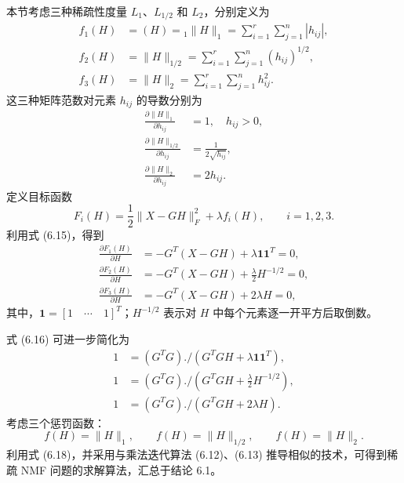 本节考虑三种稀疏性度量 $L_1$、$L_{1/2}$ 和 $L_2$，分别定义为
\[
\begin{aligned}
f_1(H)&=(H)={}_1\lVert H\rVert_1=\sum_{i=1}^r\sum_{j=1}^n|h_{ij}|,\\
f_2(H)&=\lVert H\rVert_{1/2}=\sum_{i=1}^r\sum_{j=1}^n(h_{ij})^{1/2},\\
f_3(H)&=\lVert H\rVert_2=\sum_{i=1}^r\sum_{j=1}^nh_{ij}^2.
\end{aligned}
\]
这三种矩阵范数对元素 $h_{ij}$ 的导数分别为
\begin{equation}
\begin{aligned}
\frac{\partial\lVert H\rVert_1}{\partial h_{ij}}&=1,\quad h_{ij}>0,\\
\frac{\partial\lVert H\rVert_{1/2}}{\partial h_{ij}}&=\frac1{2\sqrt{h_{ij}}},\\
\frac{\partial\lVert H\rVert_2}{\partial h_{ij}}&=2h_{ij}.
\end{aligned}
\tag{6.15}
\end{equation}
定义目标函数
\begin{equation}
F_i(H)=\frac12\lVert X-GH\rVert_F^2+\lambda f_i(H),\qquad i=1,2,3.
\tag{6.16}
\end{equation}
利用式 (6.15)，得到
\begin{equation}
\begin{aligned}
\frac{\partial F_1(H)}{\partial H}&=-G^T(X-GH)+\lambda\mathbf1\mathbf1^T=0,\\
\frac{\partial F_2(H)}{\partial H}&=-G^T(X-GH)+\frac\lambda2H^{-1/2}=0,\\
\frac{\partial F_3(H)}{\partial H}&=-G^T(X-GH)+2\lambda H=0,
\end{aligned}
\tag{6.17}
\end{equation}
其中，$\mathbf1=[1\quad\cdots\quad1]^T$；$H^{-1/2}$ 表示对 $H$ 中每个元素逐一开平方后取倒数。

式 (6.16) 可进一步简化为
\begin{equation}
\begin{aligned}
1&=(G^TG)\mathbin{./}(G^TGH+\lambda\mathbf1\mathbf1^T),\\
1&=(G^TG)\mathbin{./}\left(G^TGH+\frac\lambda2H^{-1/2}\right),\\
1&=(G^TG)\mathbin{./}(G^TGH+2\lambda H).
\end{aligned}
\tag{6.18}
\end{equation}
考虑三个惩罚函数：
\[
f(H)=\lVert H\rVert_1,\qquad f(H)=\lVert H\rVert_{1/2},\qquad f(H)=\lVert H\rVert_2.
\]
利用式 (6.18)，并采用与乘法迭代算法 (6.12)、(6.13) 推导相似的技术，可得到稀疏 NMF 问题的求解算法，汇总于结论 6.1。

